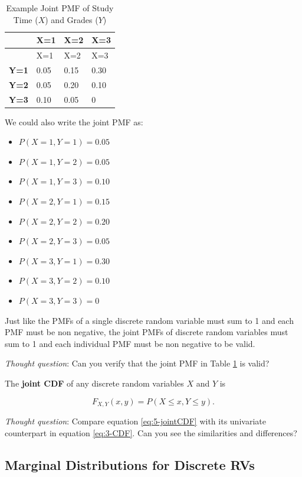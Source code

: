 \documentclass[
]{book}
\providecommand{\tightlist}{%
  \setlength{\itemsep}{0pt}\setlength{\parskip}{0pt}}
\begin{document}
\begin{longtable}[]{@{}llll@{}}
\caption{\label{tab:simple-table} Example Joint PMF of Study Time (\(X\)) and Grades (\(Y\))}\tabularnewline
\toprule\noalign{}
& X=1 & X=2 & X=3 \\
\midrule\noalign{}
\endfirsthead
\toprule\noalign{}
& X=1 & X=2 & X=3 \\
\midrule\noalign{}
\endhead
\bottomrule\noalign{}
\endlastfoot
\textbf{Y=1} & 0.05 & 0.15 & 0.30 \\
\textbf{Y=2} & 0.05 & 0.20 & 0.10 \\
\textbf{Y=3} & 0.10 & 0.05 & 0 \\
\end{longtable}

We could also write the joint PMF as:

\begin{itemize}
\tightlist
\item
  \(P(X=1, Y=1) = 0.05\)
\item
  \(P(X=1, Y=2) = 0.05\)
\item
  \(P(X=1, Y=3) = 0.10\)
\item
  \(P(X=2, Y=1) = 0.15\)
\item
  \(P(X=2, Y=2) = 0.20\)
\item
  \(P(X=2, Y=3) = 0.05\)
\item
  \(P(X=3, Y=1) = 0.30\)
\item
  \(P(X=3, Y=2) = 0.10\)
\item
  \(P(X=3, Y=3) = 0\)
\end{itemize}

Just like the PMFs of a single discrete random variable must sum to 1 and each PMF must be non negative, the joint PMFs of discrete random variables must sum to 1 and each individual PMF must be non negative to be valid.

\emph{Thought question}: Can you verify that the joint PMF in Table \ref{tab:simple-table} is valid?

The \textbf{joint CDF} of any discrete random variables \(X\) and \(Y\) is

\begin{equation} 
F_{X,Y}(x,y) = P(X \leq x, Y \leq y).
\label{eq:5-jointCDF}
\end{equation}

\emph{Thought question}: Compare equation \eqref{eq:5-jointCDF} with its univariate counterpart in equation \eqref{eq:3-CDF}. Can you see the similarities and differences?

\hypertarget{marginal-distributions-for-discrete-rvs}{%
\subsection{Marginal Distributions for Discrete RVs}\label{marginal-distributions-for-discrete-rvs}}
\end{document}
